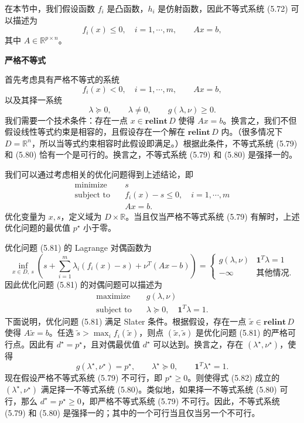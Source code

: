 \documentclass[UTF8,12pt,a4paper,fontset=fandol]{ctexart}
\begin{document}
在本节中，我们假设函数 $f_i$ 是凸函数，$h_i$ 是仿射函数，因此不等式系统 (5.72) 可以描述为
\[
f_i(x)\leq 0,\quad i=1,\cdots,m,\qquad Ax=b,
\]
其中 $A\in\mathbb{R}^{p\times n}$。

\noindent\textbf{严格不等式}

首先考虑具有严格不等式的系统
\begin{equation}
f_i(x)<0,\quad i=1,\cdots,m,\qquad Ax=b,
\tag{5.79}
\end{equation}
以及其择一系统
\begin{equation}
\lambda\succeq 0,\qquad \lambda\neq 0,\qquad g(\lambda,\nu)\geq 0.
\tag{5.80}
\end{equation}
我们需要一个技术条件：存在一点 $x\in\mathbf{relint}\,D$ 使得 $Ax=b$。换言之，我们不但假设线性等式约束是相容的，且假设存在一个解在 $\mathbf{relint}\,D$ 内。（很多情况下 $D=\mathbb{R}^n$，所以当等式约束相容时此假设即满足。）根据此条件，不等式系统 (5.79) 和 (5.80) 恰有一个是可行的。换言之，不等式系统 (5.79) 和 (5.80) 是强择一的。

我们可以通过考虑相关的优化问题得到上述结论，即
\begin{equation}
\begin{aligned}
\text{minimize}\quad & s\\
\text{subject to}\quad & f_i(x)-s\leq 0,\quad i=1,\cdots,m\\
& Ax=b.
\end{aligned}
\tag{5.81}
\end{equation}
优化变量为 $x,s$，定义域为 $D\times\mathbb{R}$。当且仅当严格不等式系统 (5.79) 有解时，上述优化问题的最优值 $p^\star$ 小于零。

优化问题 (5.81) 的 Lagrange 对偶函数为
\[
\inf_{x\in D,\ s}\left(s+\sum_{i=1}^m\lambda_i(f_i(x)-s)+\nu^T(Ax-b)\right)
=
\begin{cases}
g(\lambda,\nu) & \mathbf{1}^T\lambda=1\\
-\infty & \text{其他情况}.
\end{cases}
\]
因此优化问题 (5.81) 的对偶问题可以描述为
\[
\begin{aligned}
\text{maximize}\quad & g(\lambda,\nu)\\
\text{subject to}\quad & \lambda\succeq 0,\quad \mathbf{1}^T\lambda=1.
\end{aligned}
\]
下面说明，优化问题 (5.81) 满足 Slater 条件。根据假设，存在一点 $\tilde{x}\in\mathbf{relint}\,D$ 使得 $A\tilde{x}=b$。任选 $\tilde{s}>\max_i f_i(\tilde{x})$，则点 $(\tilde{x},\tilde{s})$ 是优化问题 (5.81) 的严格可行点。因此有 $d^\star=p^\star$，且对偶最优值 $d^\star$ 可以达到。换言之，存在 $(\lambda^\star,\nu^\star)$，使得
\begin{equation}
g(\lambda^\star,\nu^\star)=p^\star,\qquad \lambda^\star\succeq 0,\qquad \mathbf{1}^T\lambda^\star=1.
\tag{5.82}
\end{equation}
现在假设严格不等式系统 (5.79) 不可行，即 $p^\star\geq 0$。则使得式 (5.82) 成立的 $(\lambda^\star,\nu^\star)$ 满足择一不等式系统 (5.80)。类似地，如果择一不等式系统 (5.80) 可行，那么 $d^\star=p^\star\geq 0$，即严格不等式系统 (5.79) 不可行。因此，不等式系统 (5.79) 和 (5.80) 是强择一的；其中的一个可行当且仅当另一个不可行。
\end{document}
